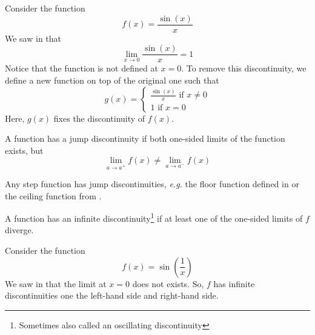 \begin{exm}\label{exm-removable-discontinuity}
	Consider the function
	\begin{equation*}
		f(x)=\frac{\sin(x)}{x}
	\end{equation*}
	We saw in  that
	\begin{equation*}
		\lim_{x\to0}\frac{\sin(x)}{x}=1
	\end{equation*}
	Notice that the function is not defined at $x=0$. To remove this discontinuity,
	we define a new function on top of the original one such that
	\begin{equation*}
		g(x)=\begin{cases}
			\frac{\sin(x)}{x}\text{ if }x\neq0 \\
			1\text{ if }x=0
		\end{cases}
	\end{equation*}
	Here, $g(x)$ fixes the discontinuity of $f(x)$.
\end{exm}

\begin{exm}\label{def-jump-discontinuity}
	A function has a jump discontinuity if both one-sided limits of the function
	exists, but
	\begin{equation*}
		\lim_{a \to a^+} f(x)\neq\lim_{a \to a^-} f(x)
	\end{equation*}
\end{exm}

\begin{exm}\label{exm-jump-discontinuity}
	Any step function has jump discontinuities, \textit{e.g.} the floor function
	defined in  or the ceiling function
	from .
\end{exm}

\begin{definition}\label{def-infinite-discontinuity}
	A function has an infinite discontinuity\footnote{Sometimes also called an
		oscillating discontinuity} if at least one of the one-sided limits of $f$
	diverge.
\end{definition}

\begin{exm}\label{exm-infinite-discontinuity}
	Consider the function
	\begin{equation*}
		f(x)=\sin\left(\frac{1}{x}\right)
	\end{equation*}
	We saw in  that the limit at $x=0$ does not exists.
	So, $f$ has infinite discontinuities one the left-hand side and right-hand side.
\end{exm}

